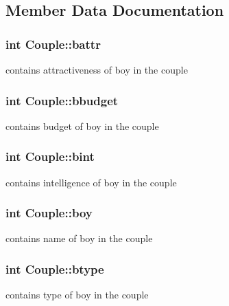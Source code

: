 \subsection{Member Data Documentation}
\subsubsection[{\texorpdfstring{battr}{battr}}]{\setlength{\rightskip}{0pt plus 5cm}int Couple\+::battr}\hypertarget{classCouple_aa9ef47b684fd069ae2ac848d1ef7cef9}{}\label{classCouple_aa9ef47b684fd069ae2ac848d1ef7cef9}
contains attractiveness of boy in the couple 
\subsubsection[{\texorpdfstring{bbudget}{bbudget}}]{\setlength{\rightskip}{0pt plus 5cm}int Couple\+::bbudget}\hypertarget{classCouple_ab678c2a69e26feaa566ab67be8767b7f}{}\label{classCouple_ab678c2a69e26feaa566ab67be8767b7f}
contains budget of boy in the couple 
\subsubsection[{\texorpdfstring{bint}{bint}}]{\setlength{\rightskip}{0pt plus 5cm}int Couple\+::bint}\hypertarget{classCouple_ad463cc378d8f237eb804c2bc365463c6}{}\label{classCouple_ad463cc378d8f237eb804c2bc365463c6}
contains intelligence of boy in the couple 
\subsubsection[{\texorpdfstring{boy}{boy}}]{\setlength{\rightskip}{0pt plus 5cm}int Couple\+::boy}\hypertarget{classCouple_ac7c2e9d064208a632548e229f1b1de3f}{}\label{classCouple_ac7c2e9d064208a632548e229f1b1de3f}
contains name of boy in the couple 
\subsubsection[{\texorpdfstring{btype}{btype}}]{\setlength{\rightskip}{0pt plus 5cm}int Couple\+::btype}\hypertarget{classCouple_aae0ea4e1bc2b28b6f7401c2d74fd658a}{}\label{classCouple_aae0ea4e1bc2b28b6f7401c2d74fd658a}
contains type of boy in the couple 
